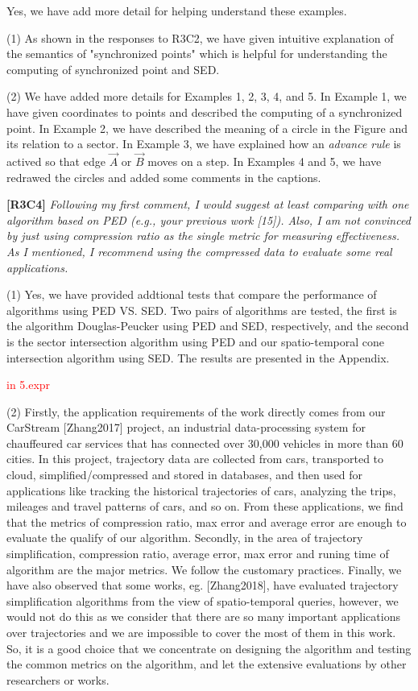 \documentclass{letter}
\begin{document}
Yes, we have add more detail for helping understand these examples. 

(1) As shown in the responses to R3C2, we have given intuitive explanation of the semantics of "synchronized points" which is helpful for understanding the computing of synchronized point and SED.

(2) We have added more details for Examples 1, 2, 3, 4, and 5. In Example 1, we have given coordinates to points and described the computing of a synchronized point. In Example 2, we have described the meaning of a circle in the Figure and its relation to a sector. In Example 3, we have explained how an \emph{advance rule} is actived so that edge $\overrightarrow{A}$ or $\overrightarrow{B}$ moves on a step. In Examples 4 and 5, we have redrawed the circles and added some comments in the captions.

\textbf{[R3C4]} \emph{Following my first comment, I would suggest at least comparing with one algorithm based on PED (e.g., your previous work [15]). Also, I am not convinced by just using compression ratio as the single metric for measuring effectiveness. As I mentioned, I recommend using the compressed data to evaluate some real applications.}

(1) Yes, we have provided addtional tests that compare the performance of algorithms using PED VS. SED. Two pairs of algorithms are tested, the first is the algorithm Douglas-Peucker using PED and SED, respectively, and the second is the sector intersection algorithm using PED and our spatio-temporal cone intersection algorithm using SED. %
The results are presented in the Appendix.

\textcolor{red}{in 5.expr}

(2) Firstly, the application requirements of the work directly comes from our CarStream [Zhang2017] project, an industrial data-processing system for chauffeured car services that has connected over 30,000 vehicles in more than 60 cities. In this project, trajectory data are collected from cars, transported to cloud, simplified/compressed and stored in databases, and then used for applications like tracking the historical trajectories of cars, analyzing the trips, mileages and travel patterns of cars, and so on. From these applications, we find that the metrics of compression ratio, max error and average error are enough to evaluate the qualify of our algorithm. Secondly, in the area of trajectory simplification, compression ratio, average error, max error and runing time of algorithm are the major metrics. We follow the customary practices. Finally, we have also observed that some {works}, eg. [Zhang2018], have evaluated trajectory simplification algorithms from the view of spatio-temporal queries, however, we would not do this as we consider that there are so many important applications over trajectories and we are impossible to cover the most of them in this work. So, it is a good choice that we concentrate on designing the algorithm and testing the common metrics on the  algorithm, and let the extensive evaluations by other researchers or works.
\end{document}
